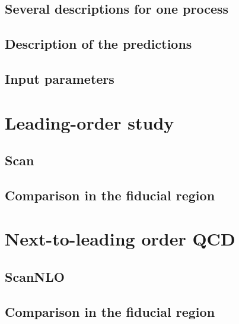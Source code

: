 \documentclass[11pt,epsf]{article}
\begin{document}
\subsection{Several descriptions for one process}



\subsection{Description of the predictions}



\subsection{Input parameters}



\section{Leading-order study}
\label{sec:LO}

\subsection{Scan}



\subsection{Comparison in the fiducial region}





\section{Next-to-leading order QCD}
\label{sec:NLO}

\subsection{ScanNLO}



\subsection{Comparison in the fiducial region}


\end{document}
